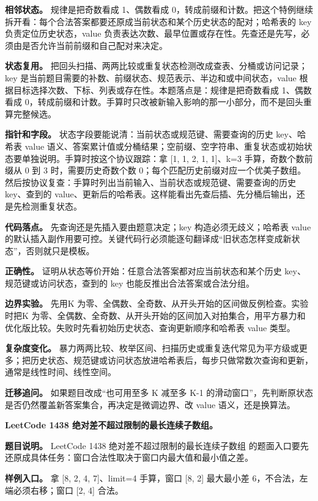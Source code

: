 \textbf{相邻状态。} 规律是把奇数看成 1、偶数看成 0，转成前缀和计数。把这个特例继续拆开看：每个合法答案都要还原成当前状态和某个历史状态的配对；哈希表的 key 负责定位历史状态，value 负责表达次数、最早位置或存在性。先查还是先写，必须由是否允许当前前缀和自己配对来决定。

\textbf{状态复用。} 把回头扫描、两两比较或重复状态检测改成查表、分桶或访问记录；key 是当前题目需要的补数、前缀状态、规范表示、半边和或中间状态，value 根据目标选择次数、下标、列表或存在性。本题落点是：规律是把奇数看成 1、偶数看成 0，转成前缀和计数。手算时只改被新输入影响的那一小部分，而不是回头重算完整候选。

\textbf{指针和字段。} 状态字段要能说清：当前状态或规范键、需要查询的历史 key、哈希表 value 语义、答案累计值或分桶结果；空前缀、空字符串、重复状态或初始状态要单独说明。手算时按这个协议跟踪：拿 [1, 1, 2, 1, 1]、k=3 手算，奇数个数前缀从 0 到 3 时，需要历史奇数个数 0；每个匹配历史前缀对应一个优美子数组。然后按协议复查：手算时列出当前输入、当前状态或规范键、需要查询的历史 key、查到的 value、更新后的哈希表。这样能看出先查后插、先分桶后输出，还是先检测重复状态。

\textbf{代码落点。} 先查询还是先插入要由题意决定；key 构造必须无歧义；哈希表 value 的默认插入副作用要可控。关键代码行必须能逐句翻译成“旧状态怎样变成新状态”，否则就只是模板。

\textbf{正确性。} 证明从状态等价开始：任意合法答案都对应当前状态和某个历史 key、规范键或访问状态，查到的 key 也能反推出合法答案或合法分组。

\textbf{边界实验。} 先用K 为零、全偶数、全奇数、从开头开始的区间做反例检查。实验时把K 为零、全偶数、全奇数、从开头开始的区间加入对拍集合，用平方暴力和优化版比较。失败时先看初始历史状态、查询更新顺序和哈希表 value 类型。

\textbf{复杂度变化。} 暴力两两比较、枚举区间、扫描历史或重复迭代常见为平方级或更多；把历史状态、规范键或访问状态放进哈希表后，每步只做常数次查询和更新，通常是线性时间、线性空间。

\textbf{迁移追问。} 如果题目改成“也可用至多 K 减至多 K-1 的滑动窗口”，先判断原状态是否仍然覆盖新答案集合，再决定是微调边界、改 value 语义，还是换算法。

\noindent\textbf{LeetCode 1438 绝对差不超过限制的最长连续子数组。}

\textbf{题目说明。} LeetCode 1438 绝对差不超过限制的最长连续子数组 的题面入口要先还原成具体任务：窗口合法性取决于窗口内最大值和最小值之差。

\textbf{样例入口。} 拿 [8, 2, 4, 7]、limit=4 手算，窗口 [8, 2] 最大最小差 6，不合法，左端必须右移；窗口 [2, 4] 合法。

